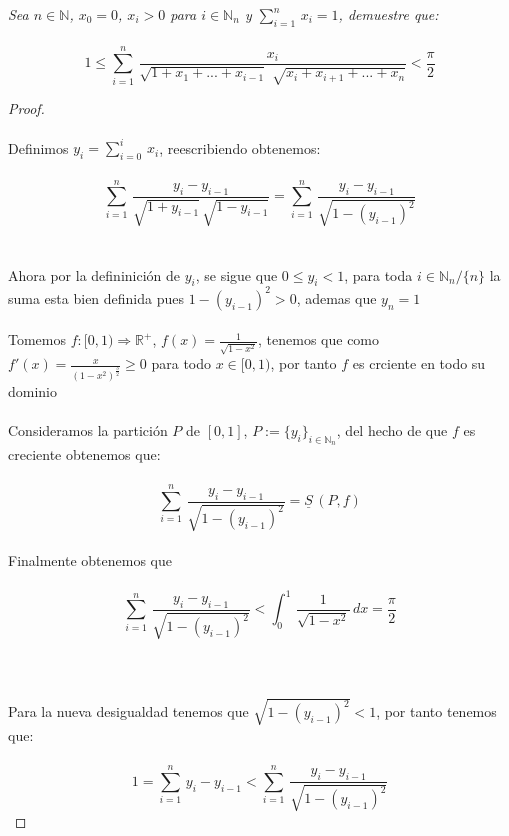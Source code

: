 \documentclass[11pt,letterpaper]{article}
\newcommand{\R}{\mathbb{R}}
\newcommand{\N}{\mathbb{N}}
\begin{document}
\begin{tcolorbox}[
	title = \textcolor{black}{\textcolor{white}{Problema 2}},]
\textit{Sea $n\in \N$, $x_0=0$, $x_i>0$ para $i\in \N_n$ y $\sum_{i=1}^{n}\,x_i=1$, demuestre que:\,\\
\,\\
\begin{equation*}
    1\leq \sum_{i=1}^{n}\,\frac{x_i}{\sqrt{1+x_1+...+x_{i-1}}\,\,\sqrt{x_i+x_{i+1}+...+x_n}}<\frac{\pi}{2}
\end{equation*}
}
\end{tcolorbox}
\begin{proof}\,\\
    \,\\
    Definimos $y_i=\sum_{i=0}^i\,x_i$, reescribiendo obtenemos:\,\\
    \,\\
    \begin{equation*}
        \sum_{i=1}^{n}\,\frac{y_i-y_{i-1}}{\sqrt{1+y_{i-1}}\,\sqrt{1-y_{i-1}}}= \sum_{i=1}^{n}\,\frac{y_i-y_{i-1}}{\sqrt{1-(y_{i-1})^2}}
    \end{equation*}\,\\
    \,\\
     Ahora por la defininici\'on de $y_i$, se sigue que $0\leq y_i< 1$, para toda $i\in \N_n/\{n\}$
     la suma esta bien definida pues $1-(y_{i-1})^2>0$, ademas que $y_n=1$\,\\
     \,\\
    Tomemos $f:[0,1)\Rightarrow \R^+$, $f(x)=\frac{1}{\sqrt{1-x^2}}$, tenemos que
    como $f'(x)=\frac{x}{(1-x^2)^{\frac{3}{2}}}\geq 0$ para todo $x\in [0,1)$, por tanto $f$ es crciente
    en todo su dominio\,\\
    \,\\
    Consideramos la partici\'on $P$ de $[0,1]$, $P:=\{y_i\}_{i\in \N_n}$, del hecho de que 
    $f$ es creciente obtenemos que:\,\\
    \,\\
    \begin{equation*}
        \sum_{i=1}^{n}\,\frac{y_i-y_{i-1}}{\sqrt{1-(y_{i-1})^2}}=\underline{S}\,(P,f)
    \end{equation*}\,\\
    Finalmente obtenemos que\,\\
    \,\\
    \begin{equation*}
        \sum_{i=1}^{n}\,\frac{y_i-y_{i-1}}{\sqrt{1-(y_{i-1})^2}}<\int_{0}^{1}\,\frac{1}{\sqrt{1-x^2}}\,dx=\frac{\pi}{2}
    \end{equation*}\,\\
    \,\\
    \newpage
    \,\\
    Para la nueva desigualdad tenemos que $\sqrt{1-(y_{i-1})^2}<1$, por tanto tenemos que:\,\\
    \,\\
    \begin{equation*}
         1=\sum_{i=1}^{n}\,y_i-y_{i-1} < \sum_{i=1}^{n}\,\frac{y_i-y_{i-1}}{\sqrt{1-(y_{i-1})^2}}
    \end{equation*}
\end{proof}\,\\
\end{document}
